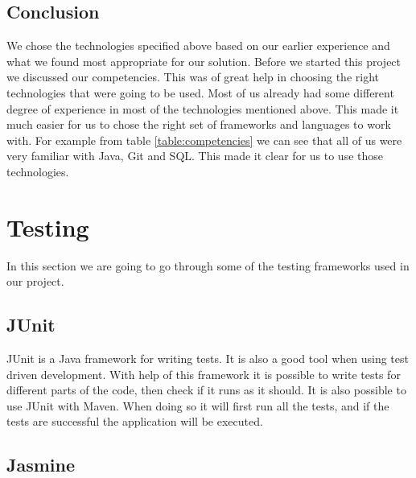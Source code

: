 \subsection{Conclusion}

We chose the technologies specified above based on our earlier experience and what we found most appropriate for our solution.
Before we started this project we discussed our competencies.
This was of great help in choosing the right technologies that were going to be used.
Most of us already had some different degree of experience in most of the technologies mentioned above.
This made it much easier for us to chose the right set of frameworks and languages to work with.
For example from table \ref{table:competencies} we can see that all of us were very familiar with Java, Git and SQL.
This made it clear for us to use those technologies.

\section{Testing}
\label{section:testing}

In this section we are going to go through some of the testing frameworks used in our project.

\subsection{JUnit} \nocite{JUnit}

JUnit is a Java framework for writing tests. It is also a good tool when using test driven development.
With help of this framework it is possible to write tests for different parts of the code, then check if it runs as it should.
It is also possible to use JUnit with Maven.
When doing so it will first run all the tests, and if the tests are successful the application will be executed.

\subsection{Jasmine} \nocite{Jasmine}

